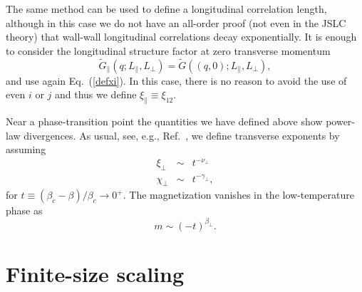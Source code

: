 \documentclass[12pt]{article}
\begin{document}
The same method can be used to define a longitudinal correlation 
length, although in this case we do not have an all-order proof 
(not even in the JSLC theory) that wall-wall longitudinal correlations
decay exponentially. 
It is enough to consider the longitudinal structure factor 
at zero transverse momentum 
\begin{equation}
\tilde{G}_\| (q;L_\|,L_\bot) = \tilde{G}((q,0);L_\|,L_\bot),
\end{equation}
and use again Eq.~(\ref{defxi}). In this case, there is no reason to 
avoid the use of even $i$ or $j$ and thus we define 
$\xi_\| \equiv \xi_{12}$.

Near a phase-transition point the quantities we have defined above 
show power-law divergences. As usual, see, e.g., Ref.~\cite{Schmittmann95},
we define transverse exponents by assuming
\begin{eqnarray}
\xi_\bot &\sim& t^{-\nu_\bot} \nonumber \\
\chi_\bot &\sim& t^{-\gamma_\bot} , 
\end{eqnarray}
for $t \equiv (\beta_c - \beta)/\beta_c\to 0^+$. 
The magnetization vanishes in the low-temperature phase as
\begin{equation}
m \sim (-t)^{\beta_\bot}.
\end{equation}


\section{Finite-size scaling}
\label{sec:fss}

%
\end{document}
